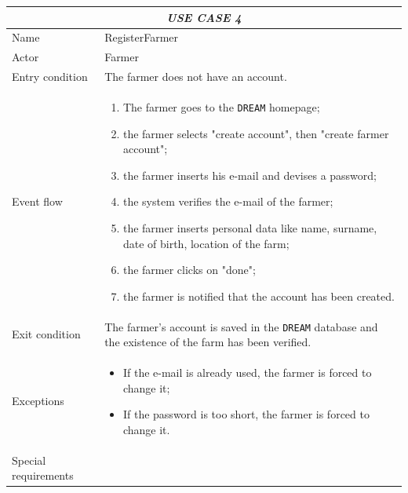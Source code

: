 \documentclass{article}
\begin{document}
\centering
\begin{longtable}{|p{3.5cm}|m{8cm}|}
 \hline
 \multicolumn{2}{|c|}{\cellcolor{white}\emph{USE CASE 4}} \\
 \endfirsthead
 \endhead
 \endfoot
 \endlastfoot
 \hline
 Name & RegisterFarmer\\
 \hline
 Actor & Farmer\\
 \hline
 Entry condition & The farmer does not have an account.\\
 \hline
 Event flow & \begin{enumerate}
    \item The farmer goes to the \verb|DREAM| homepage;
    \item the farmer selects "create account", then "create farmer account";
    \item the farmer inserts his e-mail and devises a password;
    \item the system verifies the e-mail of the farmer;
    \item the farmer inserts personal data like name, surname, date of birth, location of the farm;
    \item the farmer clicks on "done";
    \item the farmer is notified that the account has been created.
 \end{enumerate}\\
 \hline
 Exit condition & The farmer's account is saved in the \verb|DREAM| database and the existence of the farm has been verified.\\
 \hline
 Exceptions & \begin{itemize}
     \item If the e-mail is already used, the farmer is forced to change it;
     \item If the password is too short, the farmer is forced to change it.
 \end{itemize}\\
 \hline
 Special requirements & \begin{itemize} 
 \end{itemize}\\
 \hline
\end{longtable}
\end{document}
